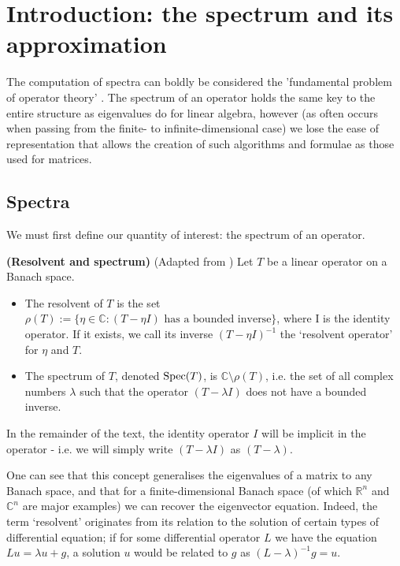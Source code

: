 \documentclass[../main.tex]{subfiles}
\begin{document}
\section{Introduction: the spectrum and its approximation}
The computation of spectra can boldly be considered the 'fundamental problem of operator theory' \parencite{arveson2002short}. The spectrum
of an operator holds the same key to the entire structure as eigenvalues do for linear algebra, however (as often occurs when passing from 
the finite- to infinite-dimensional case) we lose the ease of representation that allows the creation of such algorithms and formulae as those 
used for matrices. 

\subsection{Spectra}

We must first define our quantity of interest: the spectrum of an operator.
\begin{definition}{\textbf{(Resolvent and spectrum)}}
(Adapted from \parencite{edmunds2018spectral}) Let $T$ be a linear operator on a Banach space.
\begin{itemize}
\item The resolvent of $T$ is the set $\rho(T) := \{\eta \in \mathbb{C} : (T - \eta I)\text{ has a bounded inverse}\}$, where I is the identity operator. 
If it exists, we call its inverse $(T - \eta I)^{-1}$ the `resolvent operator' for $\eta$ and $T$.
\item The spectrum of $T$, denoted $\mathrm{Spec}(T)$, is $\mathbb{C} \setminus \rho(T)$, i.e. the set of all complex numbers $\lambda$ such 
that the operator $(T - \lambda I)$ does not have a bounded inverse.
\end{itemize}
\end{definition}

In the remainder of the text, the identity operator $I$ will be implicit in the operator - i.e. we will simply write $(T - \lambda I)$ as $(T - \lambda)$.

One can see that this concept generalises the eigenvalues of a matrix to any Banach space, and that for a finite-dimensional Banach space
(of which $\mathbb{R}^n$ and $\mathbb{C}^n$ are major examples) we can recover the eigenvector equation. Indeed, the term `resolvent'
originates from its relation to the solution of certain types of differential equation; if for some differential operator $L$ we have the equation
$Lu = \lambda u + g$, a solution $u$ would be related to $g$ as $(L - \lambda)^{-1}g = u$.
\end{document}
